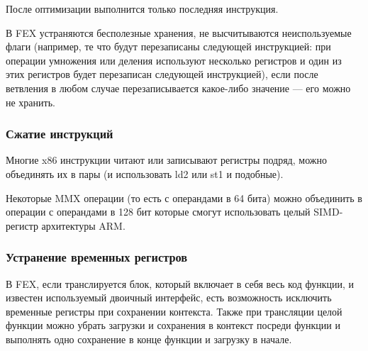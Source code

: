 После оптимизации выполнится только последняя инструкция.

В FEX устраняются бесполезные хранения, не высчитываются неиспользуемые флаги (например, те что будут перезаписаны следующей инструкцией: при операции умножения или деления используют несколько регистров и один из этих регистров будет перезаписан следующей инструкцией), если после ветвления в любом случае перезаписывается какое-либо значение --- его можно не хранить.

\subsubsection{Сжатие инструкций}

Многие x86 инструкции читают или записывают регистры подряд, можно объединять их в пары (и использовать ld2 или st1 и подобные).

Некоторые MMX операции (то есть с операндами в 64 бита) можно объединить в операции с операндами в 128 бит которые смогут использовать целый SIMD-регистр архитектуры ARM.

\subsubsection{Устранение временных регистров}

В FEX, если транслируется блок, который включает в себя весь код функции, и известен используемый двоичный интерфейс, есть возможность исключить временные регистры при сохранении контекста. Также при трансляции целой функции можно убрать загрузки и сохранения в контекст посреди функции и выполнять одно сохранение в конце функции и загрузку в начале.


